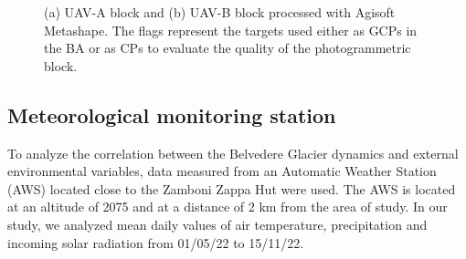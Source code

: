 \begin{figure}
  \centering
  \caption{(a) UAV-A block and (b) UAV-B block processed with Agisoft Metashape. The
    flags represent the targets used either as GCPs in the BA or as CPs to evaluate the
    quality of the photogrammetric block.}
  \label{fig:4:uavblocks}
\end{figure}

\subsection{Meteorological monitoring station}\label{sec:4:meteostation}

To analyze the correlation between the Belvedere Glacier dynamics and
external environmental variables, data measured from an Automatic Weather Station (AWS)
located close to the Zamboni Zappa Hut were used.
The AWS is located at an altitude of \SI{2075}{\masl} and at a distance of
2 km from the area of study.
In our study, we analyzed mean daily values of air temperature, precipitation and
incoming solar radiation from 01/05/22 to 15/11/22.

